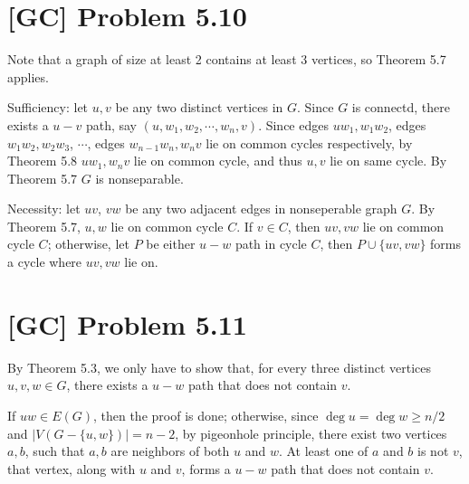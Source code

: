 \documentclass[a4paper,11pt,twocolumn]{article}
\begin{document}
  \section{[GC] Problem 5.10}
  Note that a graph of size at least 2 contains at least 3 vertices, so Theorem 5.7 applies. \par
  Sufficiency: let $u, v$ be any two distinct vertices in $G$. Since $G$ is connectd, there exists a $u-v$ path, say $(u, w_1, w_2, \cdots, w_n, v)$. Since edges $uw_1, w_1w_2$, edges $w_1w_2, w_2w_3$, $\cdots$, edges $w_{n-1}w_n, w_nv$ lie on common cycles respectively, by Theorem 5.8 $uw_1, w_nv$ lie on  common cycle, and thus $u, v$ lie on same cycle. By Theorem 5.7 $G$ is nonseparable. \par
  Necessity: let $uv$, $vw$ be any two adjacent edges in nonseperable graph $G$. By Theorem 5.7, $u, w$ lie on common cycle $C$. If $v \in C$, then $uv, vw$ lie on common cycle $C$; otherwise, let $P$ be either $u-w$ path in cycle $C$, then $P \cup \{uv, vw\}$ forms a cycle where $uv, vw$ lie on.

  \section{[GC] Problem 5.11}
  By Theorem 5.3, we only have to show that, for every three distinct vertices $u, v, w \in G$, there exists a $u-w$ path that does not contain $v$. \par
  If $uw \in E(G)$, then the proof is done; otherwise, since $ \deg u = \deg w \geq n/2$ and $|V(G - \{u, w\})| = n - 2$, by pigeonhole principle, there exist two vertices $a, b$, such that $a, b$ are neighbors of both $u$ and $w$. At least one of $a$ and $b$ is not $v$, that vertex, along with $u$ and $v$, forms a $u-w$ path that does not contain $v$.
\end{document}
